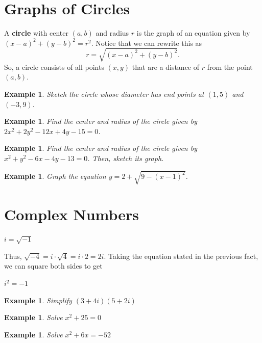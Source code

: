 \documentclass[twoside]{tufte-handout}
\newcommand{\booksection}{0}
\newcommand{\pageheader}{}
\newcounter{ekcounter}%
\theoremstyle{ekimcustom}
\newtheorem{exm}[ekcounter]{Example}
\begin{document}
\section{Graphs of Circles}
 A {\bf circle} with center $(a,b)$ and radius $r$  is the graph of an equation given by $(x-a)^2+(y-b)^2=r^2$.  
 Notice that we can rewrite this as $$r=\sqrt{(x-a)^2+(y-b)^2}.$$
 So, a circle consists of all points $(x,y)$ that are a distance of $r$ from the point $(a,b)$.


\everymath{\displaystyle}
\begin{exm}{Sketch the circle whose diameter has end points at $(1,5)$ and $(-3,9)$.}
\end{exm}\vskip10pt

\begin{exm}{Find the center and radius of the circle given by $2x^2+2y^2-12x+4y-15=0$. }
\end{exm}\vskip10pt



\everymath{\displaystyle}
\begin{exm}{Find the center and radius of the circle given by $x^2+y^2-6x-4y-13=0$. Then, sketch its graph.}
\end{exm}\vskip10pt

\begin{exm}{Graph the equation $y=2+\sqrt{9-(x-1)^2}$.}
\end{exm}\vskip10pt


\renewcommand{\booksection}{Complex Numbers}
\renewcommand{\pageheader}{\booksection }
\section*{\LARGE \pageheader}

\begin{bfact}{}{}
$i = \sqrt{-1}$
\end{bfact}
Thus, $\sqrt{-4} = i \cdot \sqrt{4} = i \cdot 2 = 2i$. Taking the equation stated in the previous fact, we can square both sides to get
\begin{bfact}{}{}
$i^2=-1$
\end{bfact}
\begin{exm}
Simplify $(3+4i)(5+2i)$
\end{exm}
\vskip10pt
\begin{exm}
Solve $x^2 + 25 = 0$
\end{exm}
\vskip10pt
\begin{exm}
Solve $x^2 + 6x = -52$
\end{exm}
\vskip10pt
\end{document}
